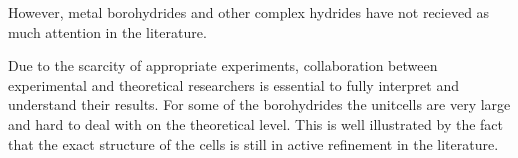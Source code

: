 However, metal borohydrides and other complex hydrides have not recieved as much attention in the literature.
\expand

Due to the scarcity of appropriate experiments, collaboration between experimental and theoretical researchers is essential to fully interpret and understand their results.
For some of the borohydrides the unitcells are very large and hard to deal with on the theoretical level.
This is well illustrated by the fact that the exact structure of the cells is still in active refinement in the literature.~\cite{cabh42-structure-p42m, cabh42-structure-p4}
\expand

